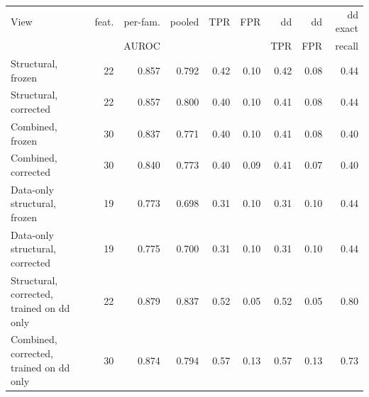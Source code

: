 \begin{tabular}{lrrrrrrrr}\toprule
View & feat. & per-fam. & pooled & TPR & FPR & dd & dd & dd exact\\
 & & AUROC & & & & TPR & FPR & recall\\\midrule
Structural, frozen & 22 & 0.857 & 0.792 & 0.42 & 0.10 & 0.42 & 0.08 & 0.44\\
Structural, corrected & 22 & 0.857 & 0.800 & 0.40 & 0.10 & 0.41 & 0.08 & 0.44\\
Combined, frozen & 30 & 0.837 & 0.771 & 0.40 & 0.10 & 0.41 & 0.08 & 0.40\\
Combined, corrected & 30 & 0.840 & 0.773 & 0.40 & 0.09 & 0.41 & 0.07 & 0.40\\
Data-only structural, frozen & 19 & 0.773 & 0.698 & 0.31 & 0.10 & 0.31 & 0.10 & 0.44\\
Data-only structural, corrected & 19 & 0.775 & 0.700 & 0.31 & 0.10 & 0.31 & 0.10 & 0.44\\
Structural, corrected, trained on dd only & 22 & 0.879 & 0.837 & 0.52 & 0.05 & 0.52 & 0.05 & 0.80\\
Combined, corrected, trained on dd only & 30 & 0.874 & 0.794 & 0.57 & 0.13 & 0.57 & 0.13 & 0.73\\
\bottomrule\end{tabular}
